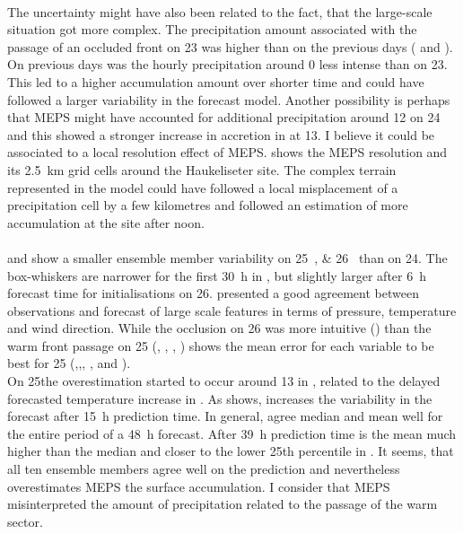 \\
The uncertainty might have also been related to the fact, that the large-scale situation got more complex. The precipitation amount associated with the passage of an occluded front on \SI{23}{\dec} was higher than on the previous days ( and ). On previous days was the hourly precipitation around \SI{0}{\UTC} less intense than on \SI{23}{\dec}. This led to a higher accumulation amount over shorter time and could have followed a larger variability in the forecast model. Another possibility is perhaps that MEPS might have accounted for additional precipitation around \SI{12}{\UTC} on \SI{24}{\dec} and this showed a stronger increase in accretion in  at \SI{13}{\UTC}. I believe it could be associated to a local resolution effect of MEPS.  shows the MEPS resolution and its \SI{2.5}{\km} grid cells around the Haukeliseter site. The complex terrain represented in the model could have followed a local misplacement of a precipitation cell by a few kilometres and followed an estimation of more accumulation at the site after noon.
\\
\\
 and  show a smaller ensemble member variability on \SIlist{25;26}{\dec} than on \SI{24}{\dec}. The box-whiskers are narrower for the first \SI{30}{\hour} in , but slightly larger after \SI{6}{\hour} forecast time for initialisations on \SI{26}{\dec}.  presented a good agreement between observations and forecast of large scale features in terms of pressure, temperature and wind direction. While the occlusion on \SI{26}{\dec} was more intuitive () than the warm front passage on \SI{25}{\dec} (, , , ) shows the mean error for each variable to be best for \SI{25}{\dec} (,,, , and ).
\\
On \SI{25}{\dec}the overestimation started to occur around \SI{13}{\UTC} in , related to the delayed forecasted temperature increase in .  As  shows, increases the variability in the forecast after \SI{15}{\hour} prediction time. In general, agree median and mean well for the entire period of a \SI{48}{\hour} forecast. After \SI{39}{\hour} prediction time is the mean much higher than the median and closer to the lower 25th percentile in . It seems, that all ten ensemble members agree well on the prediction and nevertheless overestimates MEPS the surface accumulation. I consider that MEPS misinterpreted the amount of precipitation related to the passage of the warm sector.  
